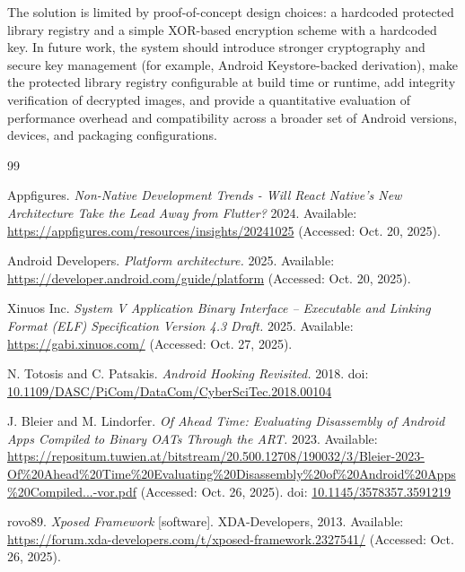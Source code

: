 \documentclass[11pt,a4paper]{report}
\renewcommand\_{{\textunderscore\allowbreak}}
\begin{document}
The solution is limited by proof-of-concept design choices: a hardcoded protected library registry and a simple XOR-based encryption scheme with a hardcoded key. In future work, the system should introduce stronger cryptography and secure key management (for example, Android Keystore-backed derivation), make the protected library registry configurable at build time or runtime, add integrity verification of decrypted images, and provide a quantitative evaluation of performance overhead and compatibility across a broader set of Android versions, devices, and packaging configurations.


\renewcommand{\bibname}{References}
\begin{thebibliography}{99}

Appfigures.
\textit{Non-Native Development Trends - Will React Native's New Architecture Take the Lead Away from Flutter?}
2024. Available:
\url{https://appfigures.com/resources/insights/20241025}
(Accessed: Oct. 20, 2025).

Android Developers.
\textit{Platform architecture.}
2025. Available:
\url{https://developer.android.com/guide/platform}
(Accessed: Oct. 20, 2025).

Xinuos Inc.
\textit{System V Application Binary Interface – Executable and Linking Format (ELF) Specification Version 4.3 Draft.}
2025. Available:
\url{https://gabi.xinuos.com/}
(Accessed: Oct. 27, 2025).

N. Totosis and C. Patsakis.
\textit{Android Hooking Revisited.}
2018.
doi: \href{https://doi.org/10.1109/DASC/PiCom/DataCom/CyberSciTec.2018.00104}{10.1109/DASC/PiCom/DataCom/CyberSciTec.2018.00104}

J. Bleier and M. Lindorfer.
\textit{Of Ahead Time: Evaluating Disassembly of Android Apps Compiled to Binary OATs Through the ART.}
2023. Available:
\url{https://repositum.tuwien.at/bitstream/20.500.12708/190032/3/Bleier-2023-Of%20Ahead%20Time%20Evaluating%20Disassembly%20of%20Android%20Apps%20Compiled...-vor.pdf}
(Accessed: Oct. 26, 2025).
doi: \href{https://doi.org/10.1145/3578357.3591219}{10.1145/3578357.3591219}

rovo89.
\textit{Xposed Framework} [software].
XDA-Developers, 2013. Available:
\url{https://forum.xda-developers.com/t/xposed-framework.2327541/}
(Accessed: Oct. 26, 2025).


\end{thebibliography}
\end{document}
